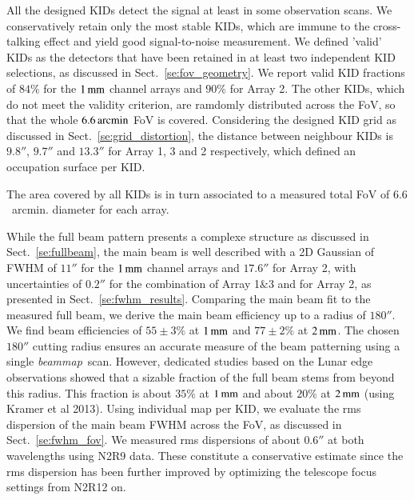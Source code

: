 \documentclass{aa}
\newcommand{\bm}{\emph{beammap}}
\begin{document}
All the designed KIDs detect the signal at least in some observation
scans. We conservatively retain only the most stable KIDs, which are
immune to the cross-talking effect and yield good signal-to-noise
measurement. We defined 'valid' KIDs as the detectors that have been
retained in at least two independent KID selections, as discussed in
Sect.~\ref{se:fov_geometry}. We report valid KID fractions of $84\%$
for the $1\,\rm{mm}$ channel arrays and $90\%$ for Array 2. The other
KIDs, which do not meet the validity criterion, are ramdomly
distributed across the FoV, so that the whole $6.6\,\rm{arcmin}$ FoV is
covered. Considering the designed KID grid as discussed in
Sect.~\ref{se:grid_distortion}, the distance between
neighbour KIDs is $9.8''$, $9.7''$ and $13.3''$ for Array 1, 3 and 2
respectively, which defined an occupation surface per KID.

The area covered by all KIDs is in turn associated to a measured total FoV of
$6.6$~arcmin. diameter for each array.

While the full beam pattern presents a complexe structure as discussed
in Sect.~\ref{se:fullbeam}, the main beam is well described with a 2D
Gaussian of FWHM of $11''$ for the $1\,\rm{mm}$ channel arrays
and $17.6''$ for Array 2, with uncertainties of  $0.2''$ for the
combination of Array 1$\&$3 and for Array 2, as presented in
Sect.~\ref{se:fwhm_results}.
Comparing the main beam fit to the measured full beam, we derive the
main beam efficiency up to a radius of $180''$. We find beam
efficiencies of $55 \pm 3 \%$ at $1\,\rm{mm}$ and $77 \pm 2 \%$ at
$2\,\rm{mm}$. %
The chosen $180''$ cutting radius ensures an accurate
measure of the beam patterning using a single \bm\ scan. However,
dedicated studies based on the Lunar edge observations showed that
a sizable fraction of the full beam stems from beyond this
radius. This fraction is about $35\%$ at $1\,\rm{mm}$ and about $20\%$
at $2\,\rm{mm}$ (using Kramer et al 2013). Using individual map per
KID, we evaluate the rms dispersion of the main beam FWHM across the
FoV, as discussed in Sect.~\ref{se:fwhm_fov}. We measured rms
dispersions of about $0.6''$ at both wavelengths using N2R9 data. These
constitute a conservative estimate since the rms dispersion has been
further improved by optimizing the telescope focus settings from N2R12
on.  
\end{document}
